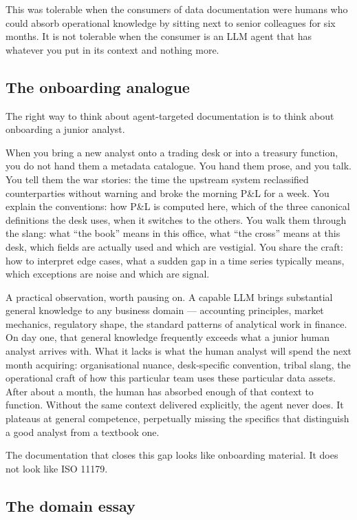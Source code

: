 \documentclass[11pt,a4paper]{article}
\begin{document}
This was tolerable when the consumers of data documentation were humans who could absorb operational knowledge by sitting next to senior colleagues for six months. It is not tolerable when the consumer is an LLM agent that has whatever you put in its context and nothing more.

\subsection{The onboarding analogue}

The right way to think about agent-targeted documentation is to think about onboarding a junior analyst.

When you bring a new analyst onto a trading desk or into a treasury function, you do not hand them a metadata catalogue. You hand them prose, and you talk. You tell them the war stories: the time the upstream system reclassified counterparties without warning and broke the morning P\&L for a week. You explain the conventions: how P\&L is computed here, which of the three canonical definitions the desk uses, when it switches to the others. You walk them through the slang: what ``the book'' means in this office, what ``the cross'' means at this desk, which fields are actually used and which are vestigial. You share the craft: how to interpret edge cases, what a sudden gap in a time series typically means, which exceptions are noise and which are signal.

A practical observation, worth pausing on. A capable LLM brings substantial general knowledge to any business domain --- accounting principles, market mechanics, regulatory shape, the standard patterns of analytical work in finance. On day one, that general knowledge frequently exceeds what a junior human analyst arrives with. What it lacks is what the human analyst will spend the next month acquiring: organisational nuance, desk-specific convention, tribal slang, the operational craft of how this particular team uses these particular data assets. After about a month, the human has absorbed enough of that context to function. Without the same context delivered explicitly, the agent never does. It plateaus at general competence, perpetually missing the specifics that distinguish a good analyst from a textbook one.

The documentation that closes this gap looks like onboarding material. It does not look like ISO 11179.

\subsection{The domain essay}
\end{document}
